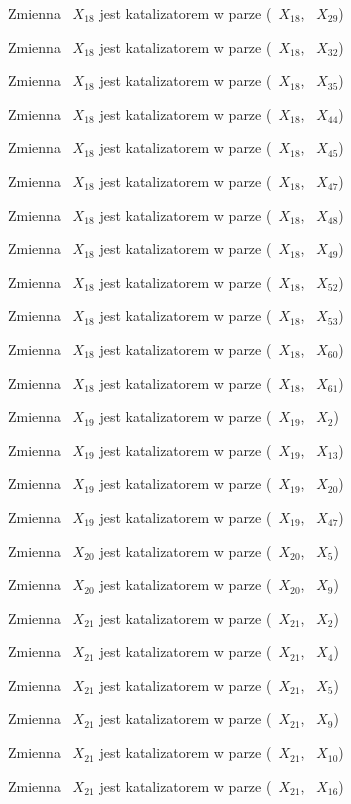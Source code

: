 \documentclass{article}
\begin{document}
Zmienna ~$X_{18}$ jest katalizatorem w parze (~$X_{18}$, ~$X_{29}$)

Zmienna ~$X_{18}$ jest katalizatorem w parze (~$X_{18}$, ~$X_{32}$)

Zmienna ~$X_{18}$ jest katalizatorem w parze (~$X_{18}$, ~$X_{35}$)

Zmienna ~$X_{18}$ jest katalizatorem w parze (~$X_{18}$, ~$X_{44}$)

Zmienna ~$X_{18}$ jest katalizatorem w parze (~$X_{18}$, ~$X_{45}$)

Zmienna ~$X_{18}$ jest katalizatorem w parze (~$X_{18}$, ~$X_{47}$)

Zmienna ~$X_{18}$ jest katalizatorem w parze (~$X_{18}$, ~$X_{48}$)

Zmienna ~$X_{18}$ jest katalizatorem w parze (~$X_{18}$, ~$X_{49}$)

Zmienna ~$X_{18}$ jest katalizatorem w parze (~$X_{18}$, ~$X_{52}$)

Zmienna ~$X_{18}$ jest katalizatorem w parze (~$X_{18}$, ~$X_{53}$)

Zmienna ~$X_{18}$ jest katalizatorem w parze (~$X_{18}$, ~$X_{60}$)

Zmienna ~$X_{18}$ jest katalizatorem w parze (~$X_{18}$, ~$X_{61}$)

Zmienna ~$X_{19}$ jest katalizatorem w parze (~$X_{19}$, ~$X_{2}$)

Zmienna ~$X_{19}$ jest katalizatorem w parze (~$X_{19}$, ~$X_{13}$)

Zmienna ~$X_{19}$ jest katalizatorem w parze (~$X_{19}$, ~$X_{20}$)

Zmienna ~$X_{19}$ jest katalizatorem w parze (~$X_{19}$, ~$X_{47}$)

Zmienna ~$X_{20}$ jest katalizatorem w parze (~$X_{20}$, ~$X_{5}$)

Zmienna ~$X_{20}$ jest katalizatorem w parze (~$X_{20}$, ~$X_{9}$)

Zmienna ~$X_{21}$ jest katalizatorem w parze (~$X_{21}$, ~$X_{2}$)

Zmienna ~$X_{21}$ jest katalizatorem w parze (~$X_{21}$, ~$X_{4}$)

Zmienna ~$X_{21}$ jest katalizatorem w parze (~$X_{21}$, ~$X_{5}$)

Zmienna ~$X_{21}$ jest katalizatorem w parze (~$X_{21}$, ~$X_{9}$)

Zmienna ~$X_{21}$ jest katalizatorem w parze (~$X_{21}$, ~$X_{10}$)

Zmienna ~$X_{21}$ jest katalizatorem w parze (~$X_{21}$, ~$X_{16}$)
\end{document}
